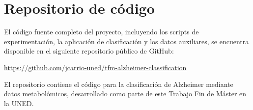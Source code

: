 \chapter{Repositorio de código}\label{app:repositorio}

El código fuente completo del proyecto, incluyendo los scripts de experimentación, la aplicación de clasificación y los datos auxiliares, se encuentra disponible en el siguiente repositorio público de GitHub:

\begin{center}
\url{https://github.com/jcarrio-uned/tfm-alzheimer-classification}
\end{center}

El repositorio contiene el código para la clasificación de Alzheimer mediante datos metabolómicos, desarrollado como parte de este Trabajo Fin de Máster en la UNED.
